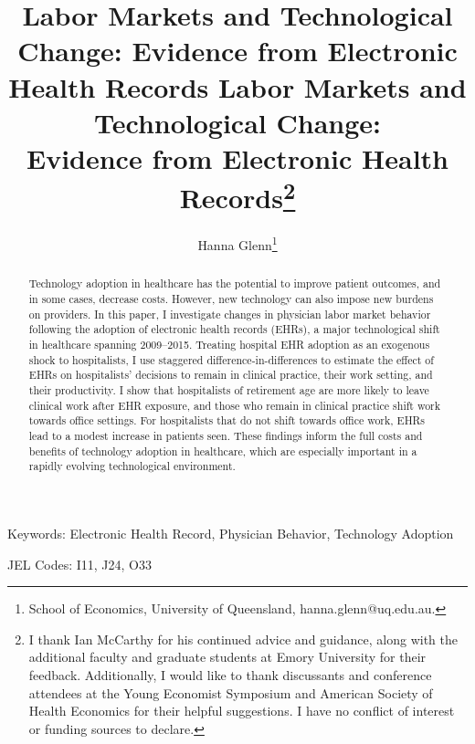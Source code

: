 \documentclass[12pt]{article}
\title{Labor Markets and Technological Change: Evidence from Electronic Health Records}
\begin{document}
\linespread{1.2}\title{\vspace{-0.5in} Labor Markets and Technological Change: \\ \Large Evidence from Electronic Health Records\thanks{I thank Ian McCarthy for his continued advice and guidance, along with the additional faculty and graduate students at Emory University for their feedback. Additionally, I would like to thank discussants and conference attendees at the Young Economist Symposium and American Society of Health Economics for their helpful suggestions. I have no conflict of interest or funding sources to declare.}}  
	
	
	\author{\vspace{10mm}Hanna Glenn\footnote{School of Economics, University of Queensland, hanna.glenn@uq.edu.au.}}
    
	
	\maketitle
	
	\vspace{-0.2in}
	
	\singlespacing\maketitle

\begin{abstract}\small
    Technology adoption in healthcare has the potential to improve patient outcomes, and in some cases, decrease costs. However, new technology can also impose new burdens on providers. In this paper, I investigate changes in physician labor market behavior following the adoption of electronic health records (EHRs), a major technological shift in healthcare spanning 2009--2015. Treating hospital EHR adoption as an exogenous shock to hospitalists, I use staggered difference-in-differences to estimate the effect of EHRs on hospitalists' decisions to remain in clinical practice, their work setting, and their productivity. I show that hospitalists of retirement age are more likely to leave clinical work after EHR exposure, and those who remain in clinical practice shift work towards office settings. For hospitalists that do not shift towards office work, EHRs lead to a modest increase in patients seen. These findings inform the full costs and benefits of technology adoption in healthcare, which are especially important in a rapidly evolving technological environment.
\end{abstract}

\vspace{2in}
	
	\noindent Keywords: Electronic Health Record, Physician Behavior, Technology Adoption

    \vspace{2mm}
	
	\noindent JEL Codes: I11, J24, O33

	
	\onehalfspacing
	
	\newpage

    
\end{document}
